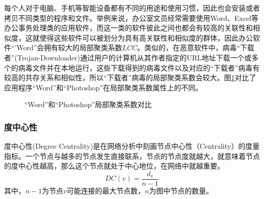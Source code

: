 每个人对于电脑、手机等智能设备都有不同的用途和使用习惯，因此也会安装或者拷贝不同类型的程序和文件。举例来说，办公室文员经常需要使用Word、Excel等办公事务处理类的应用软件，而这一类的软件彼此之间也都会有较高的关联性和相似度，这就使得这些软件可以被划分为具有高关联性和相似度的群体，因此办公软件``'Word''会拥有较大的局部聚类系数$LCC$。类似的，在恶意软件中，病毒``下载者''(Trojan-Downloader)通过用户的计算机从其作者指定的URL地址下载一个或多个的病毒文件并在本地运行，这些下载得到的病毒文件以及对应的``下载者''病毒有较高的共存关系和相似性，所以``下载者''病毒的局部聚类系数会较大。图\ref{fig:lcc}对比了应用程序``Word''和``Photoshop''在局部聚类系数属性上的不同。

\begin{figure}[!ht]
\centering
{}
\quad
{}
\caption{``Word''和``Photoshop''局部聚类系数对比}
\label{fig:lcc}
\end{figure}

\subsubsection{度中心性}
度中心性(Degree Centrality)是在网络分析中刻画节点中心性（Centrality）的度量指标。一个节点与越多的节点发生直接联系，节点的节点度就越大，就意味着节点的度中心性越高，那么这个节点就处于中心地位，在网络中就越重要\cite{scott2012social}。
\begin{equation}
DC(v)=\frac {d_{v}} {n-1}
\end{equation}
其中，$n-1$为节点$v$可能连接的最大节点数，$n$为图中节点的数量。

